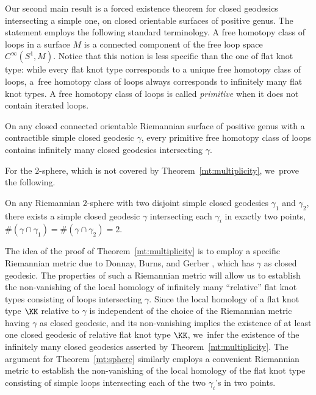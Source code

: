 Our second main result is a forced existence theorem for closed geodesics intersecting a simple one, on closed orientable surfaces of positive genus. The statement employs the following standard terminology.
A free homotopy class of loops in a surface $M$ is a connected component of the free loop space $C^\infty(S^1,M)$. Notice that this notion is less specific than the one of flat knot type: while every flat knot type corresponds to a unique free homotopy class of loops, a~free homotopy class of loops always corresponds to infinitely many flat knot types.
A free homotopy class of loops is called \emph{primitive} when it does not contain iterated loops.

\begin{MainThm}\label{mt:multiplicity}
On any closed connected orientable Riemannian surface of positive genus with a contractible simple closed geodesic $\gamma$, every primitive free homotopy class of loops contains infinitely many closed geodesics intersecting $\gamma$.
\end{MainThm}

For the $2$-sphere, which is not covered by Theorem~\ref{mt:multiplicity}, we~prove the following.

\begin{MainThm}\label{mt:sphere}
On any Riemannian $2$-sphere with two disjoint simple closed geodesics $\gamma_1$ and $\gamma_2$, there exists a simple closed geodesic $\gamma$ intersecting each $\gamma_i$ in exactly two points, \ie
$\# (\gamma\cap\gamma_1) = \#(\gamma\cap\gamma_2)=2$.
\end{MainThm}

The idea of the proof of Theorem~\ref{mt:multiplicity} is to employ a specific Riemannian metric due to Donnay, Burns, and Gerber \cite{Donnay:1988ab, Burns:1989aa}, which has $\gamma$ as closed geodesic. The properties of such a Riemannian metric will allow us to establish the non-vanishing of the local homology of infinitely many ``relative'' flat knot types consisting of loops intersecting $\gamma$. Since the local homology of a flat knot type $\KK$ relative to $\gamma$ is independent of the choice of the Riemannian metric having $\gamma$ as closed geodesic, and its non-vanishing implies the existence of at least one closed geodesic of relative flat knot type $\KK$, we~infer the existence of the infinitely many closed geodesics asserted by Theorem~\ref{mt:multiplicity}. The argument for Theorem~\ref{mt:sphere} similarly employs a convenient Riemannian metric to establish the non-vanishing of the local homology of the flat knot type consisting of simple loops intersecting each of the two $\gamma_i$'s in two points.


